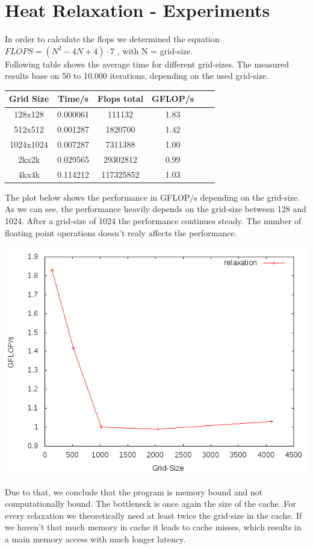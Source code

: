 \documentclass{article}
\newcommand{\enterProblemHeader}[1]{
}
\newcommand{\exitProblemHeader}[1]{
}
\newcounter{homeworkProblemCounter} %
\newcommand{\homeworkProblemName}{}
\newenvironment{homeworkProblem}[1][Problem \arabic{homeworkProblemCounter}]{ %
\stepcounter{homeworkProblemCounter} %
\renewcommand{\homeworkProblemName}{#1} %
\section{\homeworkProblemName} %
}{
}
\begin{document}
\begin{homeworkProblem}[Heat Relaxation - Experiments]
In order to calculate the flops we determined the equation
\\
$FLOPS = (N^{2} - 4N + 4) \cdot 7$ , with N = grid-size.
\\
Following table shows the average time for different grid-sizes. The measured results
base on 50 to 10.000 iterations, depending on the used grid-size.
\begin{center}
\begin{tabular}{ |c|c|c|c|c|c| }
\hline
Grid Size & Time/s & Flops total & GFLOP/s \\
\hline
128x128 & 0.000061 & 111132 & 1.83 \\ 
\hline
512x512 & 0.001287 & 1820700 & 1.42 \\ 
\hline
1024x1024 & 0.007287 & 7311388 & 1.00 \\ 
\hline
2kx2k & 0.029565 & 29302812 & 0.99 \\
\hline
4kx4k & 0.114212 & 117325852 & 1.03 \\
\hline
\end{tabular}
\end{center}
The plot below shows the performance in GFLOP/s depending on the grid-size. As we can
see, the performance heavily depends on the grid-size between 128 and 1024. After a 
grid-size of 1024 the performance continues steady. The number of floating point 
operations doesn't realy affects the performance.
\begin{center}
\includegraphics[width=0.6\columnwidth]{docu/gflops-to-size.png}
\end{center}
Due to that, we conclude that the program is memory bound and not computationally bound.
The bottleneck is once again the size of the cache. For every relaxation we theoretically
need at least twice the grid-size in the cache. If we haven't that much memory in
cache it leads to cache misses, which results in a main memory access with much longer
latency.
\end{homeworkProblem}
\end{document}
